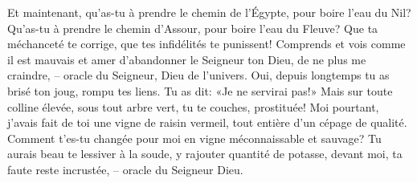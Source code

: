 Et maintenant,
	qu’as-tu à prendre le chemin de l’Égypte, pour boire l’eau du Nil?
	Qu’as-tu à prendre le chemin d’Assour, pour boire l’eau du Fleuve?
Que ta méchanceté te corrige, que tes infidélités te punissent!
	Comprends et vois comme il est mauvais et amer
		d’abandonner le Seigneur ton Dieu,
	de ne plus me craindre, – oracle du Seigneur, Dieu de l’univers.
Oui, depuis longtemps tu as brisé ton joug, rompu tes liens.
	Tu as dit: «Je ne servirai pas!»
Mais sur toute colline élevée, sous tout arbre vert,
	tu te couches, prostituée!
Moi pourtant, j’avais fait de toi une vigne de raisin vermeil,
	tout entière d’un cépage de qualité.
Comment t’es-tu changée pour moi en vigne méconnaissable et sauvage?
Tu aurais beau te lessiver à la soude, y rajouter quantité de potasse,
	devant moi, ta faute reste incrustée, – oracle du Seigneur Dieu.
